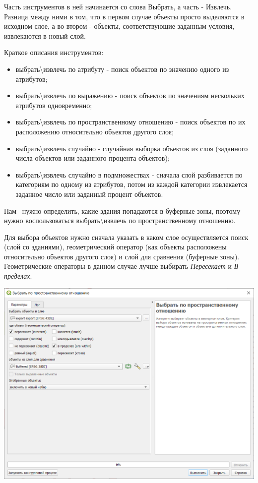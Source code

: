 \documentclass[
]{book}
\begin{document}
Часть инструментов в ней начинается со слова Выбрать, а часть - Извлечь. Разница между ними в том, что в первом случае объекты просто выделяются в исходном слое, а во втором - объекты, соответствующие заданным условия, извлекаются в новый слой.

Краткое описания инструментов:

\begin{itemize}
\item
  выбрать\textbackslash извлечь по атрибуту - поиск объектов по значению одного из атрибутов;
\item
  выбрать\textbackslash извлечь по выражению - поиск объектов по значениям нескольких атрибутов одновременно;
\item
  выбрать\textbackslash извлечь по пространственному отношению - поиск объектов по их расположению относительно объектов другого слоя;
\item
  выбрать\textbackslash извлечь случайно - случайная выборка объектов из слоя (заданного числа объектов или заданного процента объектов);
\item
  выбрать\textbackslash извлечь случайно в подмножествах - сначала слой разбивается по категориям по одному из атрибутов, потом из каждой категории извлекается заданное число или заданный процент объектов.
\end{itemize}

Нам ~нужно определить, какие здания попадаются в буферные зоны, поэтому нужно воспользоваться выбрать\textbackslash извлечь по пространственному отношению.

Для выбора объектов нужно сначала указать в каком слое осуществляется поиск (слой со зданиями), геометрический оператор (как объекты расположены относительно объектов другого слоя) и слой для сравнения (буферные зоны). Геометрические операторы в данном случае лучше выбирать \emph{Пересекает} и \emph{В пределах}.

\includegraphics{figures/49.png}
\end{document}
